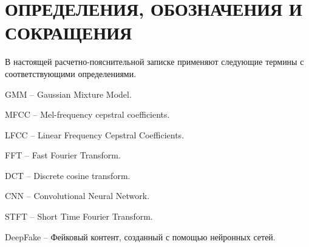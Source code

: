 \part*{ОПРЕДЕЛЕНИЯ, ОБОЗНАЧЕНИЯ И\\СОКРАЩЕНИЯ}
В настоящей расчетно-пояснительной записке применяют следующие термины с соответствующими определениями.

\begin{enumdescript}
        \item[GMM] -- Gaussian Mixture Model.
        \item[MFCC] -- Mel-frequency cepstral coefficients.
        \item[LFCC] -- Linear Frequency Cepstral Coefficients.
        \item[FFT] -- Fast Fourier Transform.
        \item[DCT] -- Discrete cosine transform.
	\item[CNN] -- Convolutional Neural Network.
	\item[STFT] -- Short Time Fourier Transform.
        \item[DeepFake] -- Фейковый контент, созданный с помощью нейронных сетей.
\end{enumdescript}
